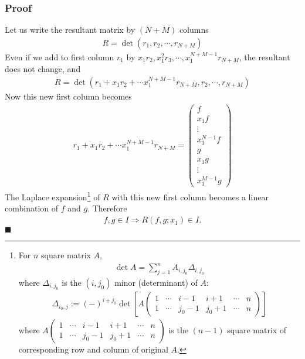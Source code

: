 \documentclass[11pt]{book}
\begin{document}
\subsubsection{Proof}
Let us write the resultant matrix by $(N+M)$ columns
\begin{eqnarray}
R = \det (r_1, r_2, \cdots, r_{N+M})
\end{eqnarray}
Even if we add to first column $r_1$ by $x_1 r_2, x_1^2 r_3, \cdots, x_1^{N+M-1} r_{N+M}$, the resultant does not change, and
\begin{eqnarray}
R = \det (r_1+ x_1 r_2 + \cdots x_1^{N+M-1} r_{N+M} , r_2, \cdots, r_{N+M})
\end{eqnarray}
Now this new first column becomes
\begin{eqnarray}
r_1+ x_1 r_2 + \cdots x_1^{N+M-1} r_{N+M}
=
\left(\begin{array}{c} f \\ x_1 f  \\ \vdots  \\ x_1^{N-1} f  \\ g  \\ x_1 g  \\ \vdots \\ x_1^{M-1} g \end{array}\right)
\end{eqnarray}
The Laplace expansion\footnote{
For $n$ square matrix $A$,
\begin{eqnarray}
\det A = \sum_{j=1}^n A_{i, j_0} \Delta_{i, j_0}
\end{eqnarray}
where $\Delta_{i, j_0}$ is the $(i, j_0)$ minor (determinant) of $A$:
\begin{eqnarray}
\Delta_{i_0, j} := (-)^{i+j_0} \det\left[ A \left(\begin{array}{cccccc}1 & \cdots  &  i-1 & i+1  & \cdots  & n  \\ 1 & \cdots  & j_0 -1  & j_0 +1  & \cdots  & n \end{array}\right)
\right]
\end{eqnarray}
where $A \left(\begin{array}{cccccc}1 & \cdots  &  i-1 & i+1  & \cdots  & n  \\ 1 & \cdots  & j_0 -1  & j_0 +1  & \cdots  & n \end{array}\right)$ is the $(n-1)$ square matrix of corresponding row and column of original $A$.

} of $R$ with this new first column becomes a linear combination of $f$ and $g$.
Therefore
\begin{eqnarray}
f,g \in I \Rightarrow R(f,g; x_1) \in I.
\end{eqnarray}
$\blacksquare$
\end{document}
